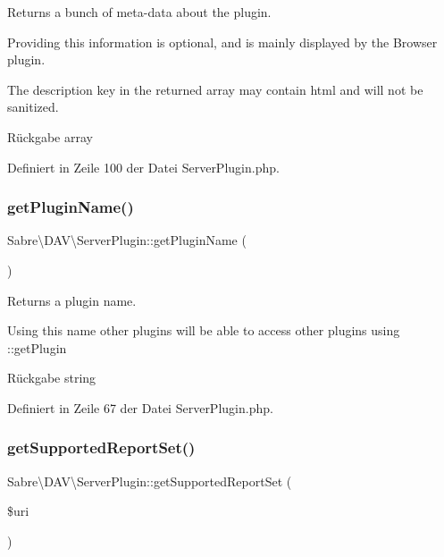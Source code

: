 Returns a bunch of meta-\/data about the plugin.

Providing this information is optional, and is mainly displayed by the Browser plugin.

The description key in the returned array may contain html and will not be sanitized.

\begin{DoxyReturn}{Rückgabe}
array 
\end{DoxyReturn}


Definiert in Zeile 100 der Datei Server\+Plugin.\+php.

\mbox{\label{class_sabre_1_1_d_a_v_1_1_server_plugin_a6699c5a1e4c8385d2eff910b7295ebaf}} 
\subsubsection{\texorpdfstring{get\+Plugin\+Name()}{getPluginName()}}
{\footnotesize\ttfamily Sabre\textbackslash{}\+D\+A\+V\textbackslash{}\+Server\+Plugin\+::get\+Plugin\+Name (\begin{DoxyParamCaption}{ }\end{DoxyParamCaption})}

Returns a plugin name.

Using this name other plugins will be able to access other plugins using \+::get\+Plugin

\begin{DoxyReturn}{Rückgabe}
string 
\end{DoxyReturn}


Definiert in Zeile 67 der Datei Server\+Plugin.\+php.

\mbox{\label{class_sabre_1_1_d_a_v_1_1_server_plugin_af0a442be6b6758ebf8b05dbc4720137b}} 
\subsubsection{\texorpdfstring{get\+Supported\+Report\+Set()}{getSupportedReportSet()}}
{\footnotesize\ttfamily Sabre\textbackslash{}\+D\+A\+V\textbackslash{}\+Server\+Plugin\+::get\+Supported\+Report\+Set (\begin{DoxyParamCaption}\item[{}]{\$uri }\end{DoxyParamCaption})}

